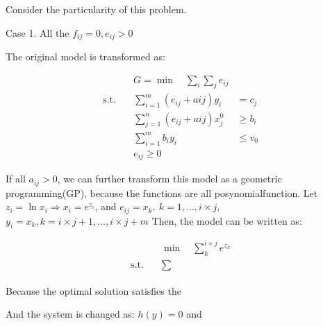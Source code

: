 \documentclass[UTF8]{article}
\begin{document}
Consider the particularity of this problem.







Case 1. All the $f_{ij} = 0, e_{ij} > 0$

The original model is transformed as:

\begin{equation}
\begin{align*}
&G =  \min \quad \sum_i \sum_j e_{ij} \\
\mathrm{s.t.}  \quad &\sum_{i=1}^m (e_{ij} + a{ij})y_i & = c_j \\
&\sum_{j=1}^n (e_{ij} + a{ij})x_j^0 & \geq b_i \\
&\sum_{i=1}^m b_i y_i & \leq v_0 \\
&e_{ij} \geq 0
\end{align*}
\end{equation}

If all $a_{ij} > 0$, we can further transform this model as a geometric programming(GP), because the functions are all posynomialfunction.
Let $z_i = \ln x_i \Rightarrow x_i = e^{z_i}$, and $e_{ij} = x_k,~ k=1,\ldots,i\times j$, $y_i = x_k, k=i\times j+1,\ldots,i\times j+m$
Then, the model can be written as:

\begin{equation}
\begin{align*}
&\min \quad \sum_k^{i\times j} e^{z_k} \\
\mathrm{s.t.} \quad &\sum_{}  
\end{align*}
\end{equation}

Because the optimal solution satisfies the

And the system is changed as: $h(y)=0$ and
\end{document}
